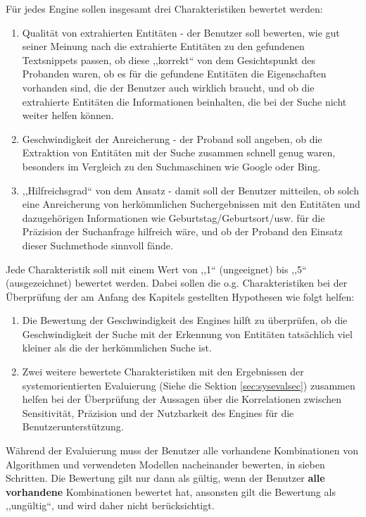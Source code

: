Für jedes Engine sollen insgesamt drei Charakteristiken bewertet werden:
\begin{enumerate}
\item Qualität von extrahierten Entitäten - der Benutzer soll bewerten, wie gut seiner Meinung nach die extrahierte Entitäten zu den gefundenen Textsnippets passen, ob diese ,,korrekt`` von dem Gesichtspunkt des Probanden waren, ob es für die gefundene Entitäten die Eigenschaften vorhanden sind, die der Benutzer auch wirklich braucht, und ob die extrahierte Entitäten die Informationen beinhalten, die bei der Suche nicht weiter helfen können.
\item Geschwindigkeit der Anreicherung - der Proband soll angeben, ob die Extraktion von Entitäten mit der Suche zusammen schnell genug waren, besonders im Vergleich zu den Suchmaschinen wie Google oder Bing.
\item ,,Hilfreichsgrad`` von dem Ansatz - damit soll der Benutzer mitteilen, ob solch eine Anreicherung von herkömmlichen Suchergebnissen mit den Entitäten und dazugehörigen Informationen wie Geburtstag/Geburtsort/usw. für die Präzision der Suchanfrage hilfreich wäre, und ob der Proband den Einsatz dieser Suchmethode sinnvoll fände. 
\end{enumerate}
Jede Charakteristik soll mit einem Wert von ,,1`` (ungeeignet) bis ,,5`` (ausgezeichnet) bewertet werden. Dabei sollen die o.g. Charakteristiken bei der Überprüfung der am Anfang des Kapitels gestellten Hypothesen wie folgt helfen:
\begin{enumerate}
\item Die Bewertung der Geschwindigkeit des Engines hilft zu überprüfen, ob die Geschwindigkeit der Suche mit der Erkennung von Entitäten tatsächlich viel kleiner als die der herkömmlichen Suche ist.
\item Zwei weitere bewertete Charakteristiken mit den Ergebnissen der systemorientierten Evaluierung (Siehe die Sektion \ref{sec:sysevalsec}) zusammen helfen bei der Überprüfung der Aussagen über die Korrelationen zwischen Sensitivität, Präzision und der Nutzbarkeit des Engines für die Benutzerunterstützung.
\end{enumerate}

Während der Evaluierung muss der Benutzer alle vorhandene Kombinationen von Algorithmen und verwendeten Modellen nacheinander bewerten, in sieben Schritten. Die Bewertung gilt nur dann als gültig, wenn der Benutzer \textbf{alle vorhandene} Kombinationen bewertet hat, ansonsten gilt die Bewertung als ,,ungültig``, und wird daher nicht berücksichtigt.

